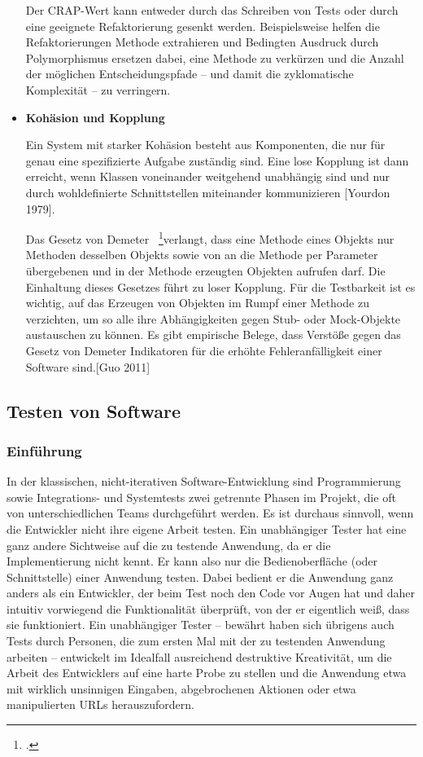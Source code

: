 \begin{itemize}
	Der CRAP-Wert kann entweder durch das Schreiben von Tests oder durch eine geeignete Refaktorierung 
	gesenkt werden. Beispielsweise helfen die Refaktorierungen Methode extrahieren und Bedingten Ausdruck 
	durch Polymorphismus ersetzen dabei, eine Methode zu verkürzen und die Anzahl der möglichen 
	Entscheidungspfade – und damit die zyklomatische Komplexität – zu verringern.
	
	\item \textbf{Kohäsion und Kopplung}
	
	Ein System mit starker Kohäsion besteht aus Komponenten, die nur für genau eine spezifizierte Aufgabe 
	zuständig sind. Eine lose Kopplung ist dann erreicht, wenn Klassen voneinander weitgehend unabhängig 
	sind und nur durch wohldefinierte Schnittstellen miteinander kommunizieren [Yourdon 1979].
	
	Das Gesetz von Demeter ~\footcite[Vgl. Seite 67-78]{Lieberherr.1989}verlangt, dass eine Methode eines Objekts nur Methoden desselben 
	Objekts sowie von an die Methode per Parameter übergebenen und 	in der Methode erzeugten Objekten aufrufen darf. 
	Die Einhaltung dieses Gesetzes führt zu loser Kopplung. Für die Testbarkeit ist es wichtig, auf das Erzeugen von Objekten im
	Rumpf einer Methode zu verzichten, um so alle ihre Abhängigkeiten gegen Stub- oder
	Mock-Objekte austauschen zu können. Es gibt empirische Belege, dass Verstöße gegen
	das Gesetz von Demeter Indikatoren für die erhöhte Fehleranfälligkeit einer Software sind.[Guo 2011]
	
\end{itemize}

\subsection{Testen von Software}\label{arten-von-tests} 
\subsubsection{Einführung} %
In der klassischen, nicht-iterativen Software-Entwicklung sind Programmierung sowie
Integrations- und Systemtests zwei getrennte Phasen im Projekt, die oft von unterschiedlichen
Teams durchgeführt werden. Es ist durchaus sinnvoll, wenn die Entwickler nicht
ihre eigene Arbeit testen. Ein unabhängiger Tester hat eine ganz andere Sichtweise auf
die zu testende Anwendung, da er die Implementierung nicht kennt. Er kann also nur
die Bedienoberfläche (oder Schnittstelle) einer Anwendung testen. Dabei bedient er die
Anwendung ganz anders als ein Entwickler, der beim Test noch den Code vor Augen hat
und daher intuitiv vorwiegend die Funktionalität überprüft, von der er eigentlich weiß,
dass sie funktioniert. Ein unabhängiger Tester – bewährt haben sich übrigens auch Tests
durch Personen, die zum ersten Mal mit der zu testenden Anwendung arbeiten – entwickelt
im Idealfall ausreichend destruktive Kreativität, um die Arbeit des Entwicklers auf
eine harte Probe zu stellen und die Anwendung etwa mit wirklich unsinnigen Eingaben,
abgebrochenen Aktionen oder etwa manipulierten URLs herauszufordern.

